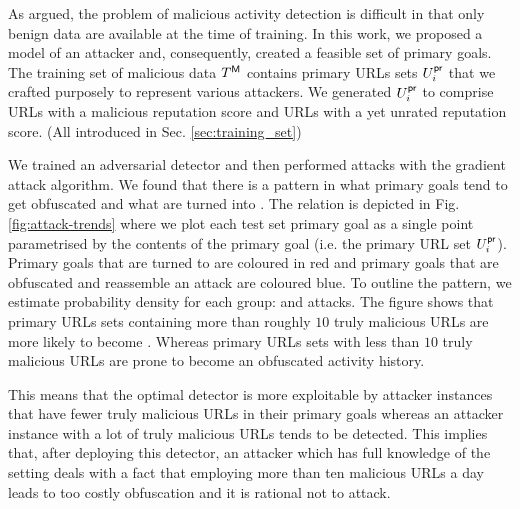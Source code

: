 As argued, the problem of malicious activity detection is difficult in that only benign data are available at the time of training. In this work, we proposed a model of an attacker and, consequently, created a feasible set of primary goals. The training set of malicious data $T^{\mathsf{M}}$ contains primary URLs sets $U_i^{\mathsf{pr}}$ that we crafted purposely to represent various attackers. We generated $U_i^{\mathsf{pr}}$ to comprise URLs with a malicious reputation score and URLs with a yet unrated reputation score. (All introduced in Sec. \ref{sec:training_set})

We trained an adversarial detector and then performed attacks with the gradient attack algorithm. We found that there is a pattern in what primary goals tend to get obfuscated and what are turned into \NA. The relation is depicted in Fig. \ref{fig:attack-trends} where we plot each test set primary goal as a single point parametrised by the contents of the primary goal (i.e. the primary URL set $U_i^{\mathsf{pr}}$). Primary goals that are turned to \NA are coloured in red and primary goals that are obfuscated and reassemble an attack are coloured blue. To outline the pattern, we estimate probability density for each group: \NA and attacks. The figure shows that primary URLs sets containing more than roughly $10$ truly malicious URLs are more likely to become \NA. Whereas primary URLs sets with less than $10$ truly malicious URLs are prone to become an obfuscated activity history.

This means that the optimal detector is more exploitable by attacker instances that have fewer truly malicious URLs in their primary goals whereas an attacker instance with a lot of truly malicious URLs tends to be detected. This implies that, after deploying this detector, an attacker which has full knowledge of the setting deals with a fact that employing more than ten malicious URLs a day leads to too costly obfuscation and it is rational not to attack.

